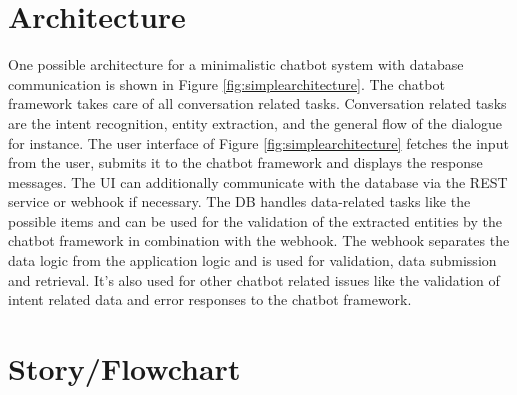 \section{Architecture}

One possible architecture for a minimalistic chatbot system with database communication is shown in Figure \ref{fig:simplearchitecture}.
The chatbot framework takes care of all conversation related tasks. 
Conversation related tasks are the intent recognition, entity extraction, and the general flow of the dialogue for instance. 
The user interface of Figure \ref{fig:simplearchitecture} fetches the input from the user, submits it to the chatbot framework 
and displays the response messages. 
The UI can additionally communicate with the database via the REST service or webhook if necessary.
The DB handles data-related tasks like the possible items and can be used for the validation of the extracted entities
 by the chatbot framework in combination with the webhook. 
 The webhook separates the data logic from the application logic and is used for validation, 
 data submission and retrieval.
 It's also used for other chatbot related issues like the validation of intent related data and error responses to the chatbot framework.

 \section{Story/Flowchart}
 
